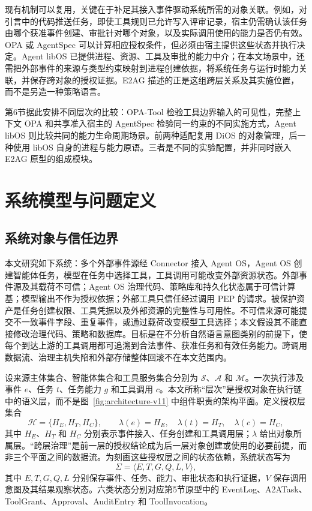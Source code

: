 现有机制可以复用，关键在于补足其接入事件驱动系统所需的对象关联。例如，对引言中的代码推送任务，即使工具规则已允许写入评审记录，宿主仍需确认该任务由哪个获准事件创建、审批针对哪个对象，以及实际调用使用的能力是否仍有效。OPA 或 AgentSpec 可以计算相应授权条件，但必须由宿主提供这些状态并执行决定。Agent libOS 已提供进程、资源、工具及审批的能力中介；在本文场景中，还需把外部事件的来源与类型约束映射到进程创建依据，将系统任务与运行时能力关联，并保存跨对象的授权证据。E2AG 描述的正是这组跨层关系及其实施位置，而不是另造一种策略语言。

第6节据此安排不同层次的比较：OPA-Tool 检验工具边界输入的可见性，完整上下文 OPA 和共享准入宿主的 AgentSpec 检验同一约束的不同实施方式，Agent libOS 则比较共同的能力生命周期场景。前两种适配复用 DiOS 的对象管理，后一种使用 libOS 自身的进程与能力原语。三者是不同的实验配置，并非同时嵌入 E2AG 原型的组成模块。

\section{系统模型与问题定义}\label{sec:problem-v11}

\subsection{系统对象与信任边界}

本文研究如下系统：多个外部事件源经 Connector 接入 Agent OS，Agent OS 创建智能体任务，模型在任务中选择工具，工具调用可能改变外部资源状态。外部事件源及其载荷不可信；Agent OS 治理代码、策略库和持久化状态属于可信计算基；模型输出不作为授权依据；外部工具只信任经过调用 PEP 的请求。被保护资产是任务创建权限、工具凭据以及外部资源的完整性与可用性。不可信来源可能提交不一致事件字段、重复事件，或通过载荷改变模型工具选择；本文假设其不能直接修改治理代码、策略和数据库。目标是在不分析自然语言意图类别的前提下，使每个到达上游的工具调用都可追溯到合法事件、获准任务和有效任务能力。跨调用数据流、治理主机失陷和外部存储整体回滚不在本文范围内。

设来源主体集合、智能体集合和工具服务集合分别为 $\mathcal{S}$、$\mathcal{A}$ 和 $\mathcal{M}$。一次执行涉及事件 $e$、任务 $t$、任务能力 $g$ 和工具调用 $c$。本文所称“层次”是授权对象在执行链中的语义层，而不是图~\ref{fig:architecture-v11} 中组件职责的架构平面。定义授权层集合
\begin{equation}
\mathcal{H}=\{H_E,H_T,H_C\},\qquad
\lambda(e)=H_E,\quad \lambda(t)=H_T,\quad \lambda(c)=H_C,
\label{eq:authorization-layers-v11}
\end{equation}
其中 $H_E$、$H_T$ 和 $H_C$ 分别表示事件接入、任务创建和工具调用层；$\lambda$ 给出对象所属层。“跨层治理”是前一层的授权结论成为后一层对象创建或使用的必要前提，而非三个平面之间的数据流。为刻画这些授权层之间的状态依赖，系统状态写为
\begin{equation}
\Sigma=\langle E,T,G,Q,L,V\rangle,
\label{eq:system-state-v11}
\end{equation}
其中 $E,T,G,Q,L$ 分别保存事件、任务、能力、审批状态和执行证据，$V$ 保存调用意图及其结果观察状态。六类状态分别对应第5节原型中的 EventLog、A2ATask、ToolGrant、Approval、AuditEntry 和 ToolInvocation。

